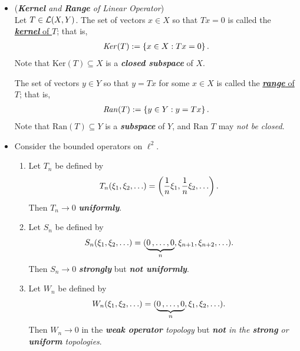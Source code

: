 \documentclass[11pt]{article}
\begin{document}
\begin{itemize}
\item \begin{definition} (\emph{\textbf{Kernel} and \textbf{Range} of Linear Operator})\\
Let $T \in {\mathcal L}(X, Y)$. The set of vectors $x \in X$ so that $Tx = 0$ is called the \underline{\emph{\textbf{kernel}} of $T$}; that is,
\begin{align*}
\text{\emph{Ker}}(T) := \left\{x \in X: Tx = 0\right\}.
\end{align*} Note that $\text{Ker}(T) \subseteq X$ is a \emph{\textbf{closed subspace}} of $X$.

The set of vectors $y \in Y$ so that $y = Tx$ for some $x \in X$ is  called the \underline{\emph{\textbf{range}} of $T$}; that is,
\begin{align*}
\text{\emph{Ran}}(T) := \left\{y \in Y: y = Tx\right\}.
\end{align*} Note that $\text{Ran}(T) \subseteq Y$ is a \emph{\textbf{subspace}} of $Y$, and $\text{Ran }T $ may \emph{not be closed}.
\end{definition}

\item \begin{example}
Consider the bounded operators on $\ell^2$.
\begin{enumerate}
\item  Let $T_n$ be defined by 
\begin{align*}
T_{n}(\xi_1, \xi_2, \ldots) &= \left(\frac{1}{n}\xi_1, \frac{1}{n}\xi_2, \ldots\right).
\end{align*}
Then $T_n \rightarrow 0$ \emph{\textbf{uniformly}}. 

\item Let $S_n$ be defined by 
\begin{align*}
S_{n}(\xi_1, \xi_2, \ldots) &= ( \underbrace{0 \,{,}\ldots{,}\, 0}_{n}, \xi_{n+1}, \xi_{n+2}, \ldots ).
\end{align*}
Then $S_n \rightarrow 0$ \emph{\textbf{strongly}} but \emph{\textbf{not uniformly}}. 

\item Let $W_n$ be defined by 
\begin{align*}
W_{n}(\xi_1, \xi_2, \ldots) &= ( \underbrace{0 \,{,}\ldots{,}\, 0}_{n}, \xi_{1}, \xi_{2}, \ldots ).
\end{align*}
Then $W_n \rightarrow 0$ in the \emph{\textbf{weak operator} topology} but \emph{\textbf{not} in the \textbf{strong}  or \textbf{uniform} topologies}. 
\end{enumerate}
\end{example}
\end{itemize}
\end{document}
